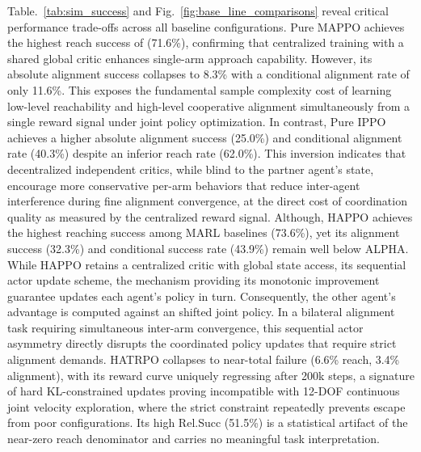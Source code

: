 \documentclass[lettersize,journal]{IEEEtran}
\begin{document}
Table.~\ref{tab:sim_success} and Fig.~\ref{fig:base_line_comparisons} reveal critical performance trade-offs across all baseline configurations. Pure MAPPO achieves the highest reach success of (71.6\%), confirming that centralized training with a shared global critic enhances single-arm approach capability. However, its absolute alignment success collapses to 8.3\% with a conditional alignment rate of only 11.6\%. This exposes the fundamental sample complexity cost of learning low-level reachability and high-level cooperative alignment simultaneously from a single reward signal under joint policy optimization. In contrast, Pure IPPO achieves a higher absolute alignment success (25.0\%) and conditional alignment rate (40.3\%) despite an inferior reach rate (62.0\%). This inversion indicates that decentralized independent critics, while blind to the partner agent's state, encourage more conservative per-arm behaviors that reduce inter-agent interference during fine alignment convergence, at the direct cost of coordination quality as measured by the centralized reward signal. Although, HAPPO achieves the highest reaching success among MARL baselines (73.6\%), yet its alignment success (32.3\%) and conditional success rate (43.9\%) remain well below ALPHA. While HAPPO retains a centralized critic with global state access, its sequential actor update scheme, the mechanism providing its monotonic improvement guarantee updates each agent's policy in turn. Consequently, the other agent's advantage is computed against an shifted joint policy. In a bilateral alignment task requiring simultaneous inter-arm convergence, this sequential actor asymmetry directly disrupts the coordinated policy updates that require strict alignment demands. HATRPO collapses to near-total failure (6.6\% reach, 3.4\% alignment), with its reward curve uniquely regressing after 200k steps, a signature of hard KL-constrained updates proving incompatible with 12-DOF continuous joint velocity exploration, where the strict constraint repeatedly prevents escape from poor configurations. Its high Rel.Succ (51.5\%) is a statistical artifact of the near-zero reach denominator and carries no meaningful task interpretation.
\end{document}
